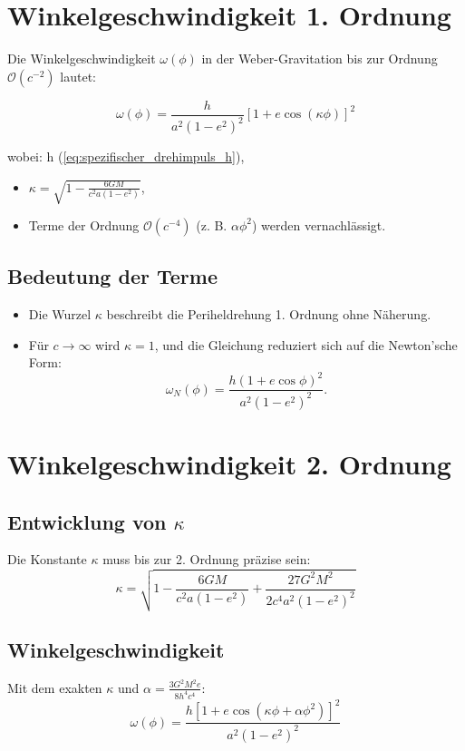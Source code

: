 \newpage
\section{Winkelgeschwindigkeit 1. Ordnung}
Die Winkelgeschwindigkeit \(\omega(\phi)\) in der Weber-Gravitation bis zur Ordnung \(\mathcal{O}(c^{-2})\) lautet:

\begin{equation}
\omega(\phi) = \frac{h}{a^2(1 - e^2)^2} \left[1 + e \cos\left(\kappa\phi\right)\right]^2
\end{equation}

wobei:
h (\ref{eq:spezifischer_drehimpuls_h}),
\begin{itemize}
    \item \(\kappa = \sqrt{1 - \frac{6GM}{c^2a(1 - e^2)}}\),
    \item Terme der Ordnung \(\mathcal{O}(c^{-4})\) (z. B. \(\alpha\phi^2\)) werden vernachlässigt.
\end{itemize}

\subsection*{Bedeutung der Terme}
\begin{itemize}
    \item Die Wurzel \(\kappa\) beschreibt die Periheldrehung 1. Ordnung ohne Näherung.
    \item Für \(c \to \infty\) wird \(\kappa = 1\), und die Gleichung reduziert sich auf die Newton’sche Form:
    \[
    \omega_N(\phi) = \frac{h(1 + e \cos\phi)^2}{a^2(1 - e^2)^2}.
    \]
\end{itemize}

\section{Winkelgeschwindigkeit 2. Ordnung}

\subsection{Entwicklung von \(\kappa\)}
Die Konstante \(\kappa\) muss bis zur 2. Ordnung präzise sein:
\begin{equation}
\kappa = \sqrt{1 - \frac{6GM}{c^2a(1-e^2)} + \frac{27G^2M^2}{2c^4a^2(1-e^2)^2}}
\end{equation}

\subsection{Winkelgeschwindigkeit}
Mit dem exakten \(\kappa\) und \(\alpha = \frac{3G^2M^2e}{8h^4c^4}\):
\begin{equation}
\boxed
{
    \omega(\phi) = \frac{h[1 + e\cos(\kappa\phi + \alpha\phi^2)]^2}{a^2(1-e^2)^2}
}
\end{equation}
